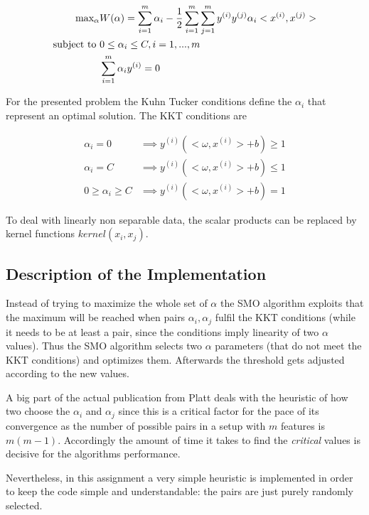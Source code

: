 \begin{align}
\text{max}_\alpha& W(\alpha) = \sum_{i=1}^m \alpha _i - \frac{1}{2} \sum_{i=1}^m \sum_{j=1}^m y^{(i)} y^{(j)} \alpha _i <x^{(i)}, x^{(j)}> \\
\text{subject to \em} & 0\leq \alpha _i \leq C, i = 1,..., m \\
& \sum_{i=1}^m \alpha _i y^{(i)} = 0 \label{eq:sumalpha}
\end{align}

For the presented problem the Kuhn Tucker conditions define the $\alpha _i$ that represent an optimal solution. The KKT conditions are

\begin{align}
\alpha _i = 0 & \implies  y^{(i)}(<\omega, x^{(i)}> + b)  \geq 1 \\
\alpha _i = C & \implies  y^{(i)}(<\omega, x^{(i)}> + b)  \leq 1 \\
0 \geq \alpha _i \geq C & \implies  y^{(i)}(<\omega, x^{(i)}> + b)  = 1 \label{eq:alphabounds}
\end{align}

To deal with linearly non separable data, the scalar products can be replaced by kernel functions $kernel(x_i, x_j)$.

\subsection{Description of the Implementation}
Instead of trying to maximize the whole set of $\alpha$ the SMO algorithm exploits that the maximum will be reached when pairs $\alpha _i, \alpha _j$ fulfil the KKT conditions (while it needs to be at least a pair, since the conditions imply linearity of two $\alpha$ values). Thus the SMO algorithm selects two $\alpha$ parameters (that do not meet the KKT conditions) and optimizes them. Afterwards the threshold gets adjusted according to the new values.

A big part of the actual publication from Platt deals with the heuristic of how two choose the $\alpha _i$ and $\alpha _j$ since this is a critical factor for the pace of its convergence as the number of possible pairs in a setup with $m$ features is $m(m-1)$. Accordingly the amount of time it takes to find the \textit{critical} values is decisive for the algorithms performance.

Nevertheless, in this assignment a very simple heuristic is implemented in order to keep the code simple and understandable: the pairs are just purely randomly selected.

